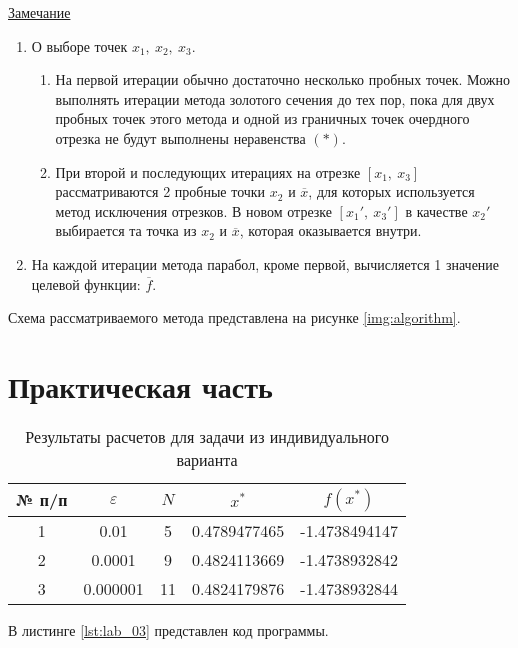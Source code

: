 \documentclass{bmstu}
\begin{document}
\underline{Замечание}
\begin{enumerate}
    \item О выборе точек $x_1, \ x_2, \ x_3$.
    \begin{enumerate}
        \item На первой итерации обычно достаточно несколько пробных точек. Можно выполнять итерации метода золотого сечения до тех пор, пока для двух пробных точек этого метода и одной из граничных точек очердного отрезка не будут выполнены неравенства $(*)$.
        \item При второй и последующих итерациях на отрезке $[x_1, \ x_3]$ рассматриваются 2 пробные точки $x_2$ и $\overline{x}$, для которых используется метод исключения отрезков. В новом отрезке $[x_1', \ x_3']$ в качестве $x_2'$ выбирается та точка из $x_2$ и $\overline{x}$, которая оказывается внутри.
    \end{enumerate}
    \item На каждой итерации метода парабол, кроме первой, вычисляется 1 значение целевой функции: $\overline{f}$.
\end{enumerate}

\clearpage

Схема рассматриваемого метода представлена на рисунке \ref{img:algorithm}. 



\chapter{Практическая часть}

\begin{table}[H]
    \centering
	\caption{Результаты расчетов для задачи из индивидуального варианта}
    \label{tbl:task}
	\begin{tabular}{|c|c|c|c|c|}
        \hline
        № п/п & $\varepsilon$ & $N$ & $x^*$ & $f(x^*)$ \\ \hline
        1 & 0.01 & 5 & 0.4789477465 & -1.4738494147 \\ \hline
        2 & 0.0001 & 9 & 0.4824113669 & -1.4738932842 \\ \hline
        3 & 0.000001 & 11 & 0.4824179876 & -1.4738932844 \\ \hline
    \end{tabular}
\end{table}

В листинге \ref{lst:lab_03} представлен код программы.

\end{document}
